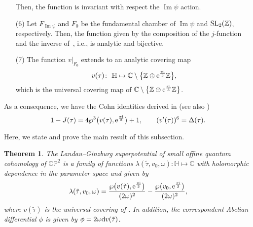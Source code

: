 \documentclass[pdftex]{sigma}
\numberwithin{equation}{section}
\newtheorem{Theorem}{Theorem}[section]
\begin{document}
\begin{enumerate}
Then, the function  is invariant with respect the $\operatorname{Im} \psi$ action.
\item[(6)] Let $F_{\operatorname{Im}\psi}$ and $F_0$ be the fundamental chamber of $\operatorname{Im}\psi$ and ${\rm SL}_2(\mathbb{Z})$, respectively. Then, the function
given by the composition of the $j$-function and the inverse of~, i.e.,
is analytic and bijective.
\item[(7)]
The function $v\big|_{F_0}$ extends to an analytic covering map
\begin{gather}\label{universal covering map equiharmonic lattice 2}
v(\tau)\colon \ \mathbb{H}\mapsto \mathbb{C}\setminus\bigl\{ \mathbb{Z}\oplus {\rm e}^{\frac{\pi {\rm i}}{3}}\mathbb{Z}\bigr\} ,
\end{gather}
which is the universal covering map of $ \mathbb{C}\setminus\bigl\{ \mathbb{Z}\oplus {\rm e}^{\frac{\pi {\rm i}}{3}}\mathbb{Z}\bigr\} $.
\end{enumerate}

As a consequence, we have the Cohn identities derived in \cite[Section 9]{Cohn} (see also \cite{M.Batchelor,Golubev})
\begin{gather}
1-J(\tau)=4\wp^3\bigl(v(\tau),{\rm e}^{\frac{\pi {\rm i}}{3}}\bigr)+1,\qquad
(v^{\prime}(\tau))^6=\Delta(\tau).\label{universal covering map equiharmonic lattice}
\end{gather}

Here, we state and prove the main result of this subsection.

\begin{Theorem}
The Landau--Ginzburg superpotential of small affine quantum cohomology of $\mathbb{CP}^2$ is a family of functions
$
\lambda(\tilde\tau, v_0, \omega)\colon \mathbb{H} \mapsto \mathbb{C}
$
with holomorphic dependence in the parameter space
 and given by
\begin{gather*}
\lambda(\tilde\tau,v_0,\omega)=\frac{\wp\bigl(v(\tilde\tau),{\rm e}^{\frac{\pi {\rm i} }{3}}\bigr)}{(2\omega)^2}-\frac{\wp\bigl(v_0,{\rm e}^{\frac{\pi {\rm i} }{3}}\bigr)}{(2\omega)^2},
\end{gather*}
where $v(\tilde\tau)$ is the universal covering of .
 In addition, the correspondent Abelian differential $\phi$ is given by
$
\phi=2\omega {\rm d}v(\tilde\tau)$.

\end{Theorem}
\end{document}
